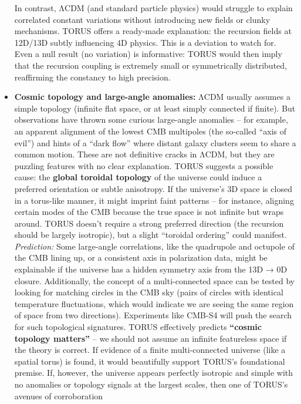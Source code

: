 \begin{itemize}
  In contrast, ΛCDM (and standard particle physics) would struggle to
  explain correlated constant variations without introducing new fields
  or clunky mechanisms. TORUS offers a ready-made explanation: the
  recursion fields at 12D/13D subtly influencing 4D physics​. This is a
  deviation to watch for. Even a null result (no variation) is
  informative: TORUS would then imply that the recursion coupling is
  extremely small or symmetrically distributed, reaffirming the
  constancy to high precision.
\item
  \textbf{Cosmic topology and large-angle anomalies:} ΛCDM usually
  assumes a simple topology (infinite flat space, or at least simply
  connected if finite). But observations have thrown some curious
  large-angle anomalies -- for example, an apparent alignment of the
  lowest CMB multipoles (the so-called ``axis of evil'') and hints of a
  ``dark flow'' where distant galaxy clusters seem to share a common
  motion. These are not definitive cracks in ΛCDM, but they are puzzling
  features with no clear explanation. TORUS suggests a possible cause:
  the \textbf{global toroidal topology} of the universe could induce a
  preferred orientation or subtle anisotropy. If the universe's 3D space
  is closed in a torus-like manner, it might imprint faint patterns --
  for instance, aligning certain modes of the CMB because the true space
  is not infinite but wraps around. TORUS doesn't require a strong
  preferred direction (the recursion should be largely isotropic), but a
  slight ``toroidal ordering'' could manifest. \emph{Prediction:} Some
  large-angle correlations, like the quadrupole and octupole of the CMB
  lining up, or a consistent axis in polarization data, might be
  explainable if the universe has a hidden symmetry axis from the 13D →
  0D closure​. Additionally, the concept of a multi-connected space can
  be tested by looking for matching circles in the CMB sky (pairs of
  circles with identical temperature fluctuations, which would indicate
  we are seeing the same region of space from two directions).
  Experiments like CMB-S4 will push the search for such topological
  signatures​. TORUS effectively predicts \textbf{``cosmic topology
  matters''} -- we should not assume an infinite featureless space if
  the theory is correct. If evidence of a finite multi-connected
  universe (like a spatial torus) is found, it would beautifully support
  TORUS's foundational premise. If, however, the universe appears
  perfectly isotropic and simple with no anomalies or topology signals
  at the largest scales, then one of TORUS's avenues of corroboration

\end{itemize}

